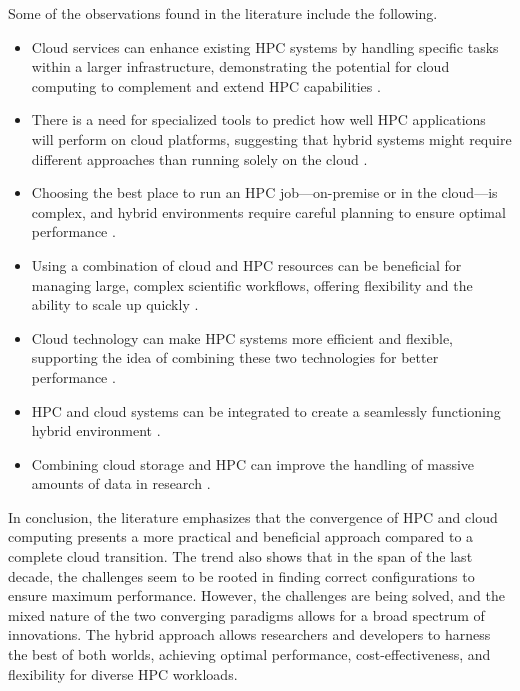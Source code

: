 Some of the observations found in the literature include the following.

\begin{itemize}
    \item Cloud services can enhance existing HPC systems by handling specific tasks within a larger infrastructure, demonstrating the potential for cloud computing to complement and extend HPC capabilities \cite{colonnelli_bringing_nodate}.
    \item There is a need for specialized tools to predict how well HPC applications will perform on cloud platforms, suggesting that hybrid systems might require different approaches than running solely on the cloud \cite{noauthor_hpccloud_nodate}.
    \item Choosing the best place to run an HPC job—on-premise or in the cloud—is complex, and hybrid environments require careful planning to ensure optimal performance \cite{cunha_job_2016}.
    \item Using a combination of cloud and HPC resources can be beneficial for managing large, complex scientific workflows, offering flexibility and the ability to scale up quickly \cite{balis_scientific_2021}.
    \item Cloud technology can make HPC systems more efficient and flexible, supporting the idea of combining these two technologies for better performance \cite{noauthor_harnessing_nodate}.
    \item HPC and cloud systems can be integrated to create a seamlessly functioning hybrid environment \cite{noauthor_consideration_nodate}.
    \item Combining cloud storage and HPC can improve the handling of massive amounts of data in research \cite{gadban_analyzing_2022}.
\end{itemize}

In conclusion, the literature emphasizes that the convergence of HPC and cloud computing presents a more practical and beneficial approach compared to a complete cloud transition. The trend also shows that in the span of the last decade, the challenges seem to be rooted in finding correct configurations to ensure maximum performance. However, the challenges are being solved, and the mixed nature of the two converging paradigms allows for a broad spectrum of innovations. The hybrid approach allows researchers and developers to harness the best of both worlds, achieving optimal performance, cost-effectiveness, and flexibility for diverse HPC workloads.



